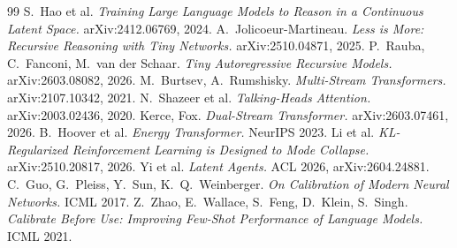 \documentclass[a4paper,11pt,parskip=half]{scrartcl}
\begin{document}
\begin{thebibliography}{99}
 S.~Hao et al. \emph{Training Large Language Models to Reason in a Continuous Latent Space.} arXiv:2412.06769, 2024.
 A.~Jolicoeur-Martineau. \emph{Less is More: Recursive Reasoning with Tiny Networks.} arXiv:2510.04871, 2025.
 P.~Rauba, C.~Fanconi, M.~van der Schaar. \emph{Tiny Autoregressive Recursive Models.} arXiv:2603.08082, 2026.
 M.~Burtsev, A.~Rumshisky. \emph{Multi-Stream Transformers.} arXiv:2107.10342, 2021.
 N.~Shazeer et al. \emph{Talking-Heads Attention.} arXiv:2003.02436, 2020.
 Kerce, Fox. \emph{Dual-Stream Transformer.} arXiv:2603.07461, 2026.
 B.~Hoover et al. \emph{Energy Transformer.} NeurIPS 2023.
 Li et al. \emph{KL-Regularized Reinforcement Learning is Designed to Mode Collapse.} arXiv:2510.20817, 2026.
 Yi et al. \emph{Latent Agents.} ACL 2026, arXiv:2604.24881.
 C.~Guo, G.~Pleiss, Y.~Sun, K.~Q.~Weinberger. \emph{On Calibration of Modern Neural Networks.} ICML 2017.
 Z.~Zhao, E.~Wallace, S.~Feng, D.~Klein, S.~Singh. \emph{Calibrate Before Use: Improving Few-Shot Performance of Language Models.} ICML 2021.
\end{thebibliography}
\end{document}
